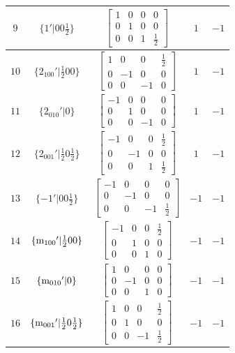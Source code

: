 \documentclass[fleqn,8pt]{jsarticle}
\begin{document}
\begin{longtable}{ccccc}
$ 9 $ & $ \{1{}'|0 0 \frac{1}{2}\} $ & $ \begin{bmatrix} 1 & 0 & 0 & 0 \\ 0 & 1 & 0 & 0 \\ 0 & 0 & 1 & \frac{1}{2} \end{bmatrix} $ & $ 1 $ & $ -1 $ \\ \hline
$ 10 $ & $ \{2{}_{100}{}'|\frac{1}{2} 0 0\} $ & $ \begin{bmatrix} 1 & 0 & 0 & \frac{1}{2} \\ 0 & -1 & 0 & 0 \\ 0 & 0 & -1 & 0 \end{bmatrix} $ & $ 1 $ & $ -1 $ \\ \hline
$ 11 $ & $ \{2{}_{010}{}'|0\} $ & $ \begin{bmatrix} -1 & 0 & 0 & 0 \\ 0 & 1 & 0 & 0 \\ 0 & 0 & -1 & 0 \end{bmatrix} $ & $ 1 $ & $ -1 $ \\ \hline
$ 12 $ & $ \{2{}_{001}{}'|\frac{1}{2} 0 \frac{1}{2}\} $ & $ \begin{bmatrix} -1 & 0 & 0 & \frac{1}{2} \\ 0 & -1 & 0 & 0 \\ 0 & 0 & 1 & \frac{1}{2} \end{bmatrix} $ & $ 1 $ & $ -1 $ \\ \hline
$ 13 $ & $ \{-1{}'|0 0 \frac{1}{2}\} $ & $ \begin{bmatrix} -1 & 0 & 0 & 0 \\ 0 & -1 & 0 & 0 \\ 0 & 0 & -1 & \frac{1}{2} \end{bmatrix} $ & $ -1 $ & $ -1 $ \\ \hline
$ 14 $ & $ \{{\rm m}_{100}{}'|\frac{1}{2} 0 0\} $ & $ \begin{bmatrix} -1 & 0 & 0 & \frac{1}{2} \\ 0 & 1 & 0 & 0 \\ 0 & 0 & 1 & 0 \end{bmatrix} $ & $ -1 $ & $ -1 $ \\ \hline
$ 15 $ & $ \{{\rm m}_{010}{}'|0\} $ & $ \begin{bmatrix} 1 & 0 & 0 & 0 \\ 0 & -1 & 0 & 0 \\ 0 & 0 & 1 & 0 \end{bmatrix} $ & $ -1 $ & $ -1 $ \\ \hline
$ 16 $ & $ \{{\rm m}_{001}{}'|\frac{1}{2} 0 \frac{1}{2}\} $ & $ \begin{bmatrix} 1 & 0 & 0 & \frac{1}{2} \\ 0 & 1 & 0 & 0 \\ 0 & 0 & -1 & \frac{1}{2} \end{bmatrix} $ & $ -1 $ & $ -1 $ \\
\end{longtable}
\end{document}
